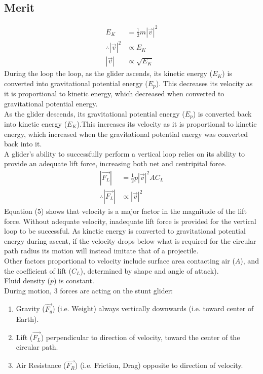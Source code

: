 \documentclass[11pt, a4paper]{article}
\def\ParagraphSpacing{30pt}
\begin{document}
	\subsection{Merit}
	\begin{align}
		E_K&=\frac{1}{2}m|\vec{v}|^2\\
		\therefore |\vec{v}|^2&\propto E_K\\
		|\vec{v}|&\propto \sqrt{E_K}
	\end{align}
	During the loop the loop, as the glider ascends, its kinetic energy ($E_K$) is converted into gravitational potential energy ($E_p$). This decreases its velocity as it is proportional to kinetic energy, which decreased when converted to gravitational potential energy. \\
	As the glider descends, its gravitational potential energy ($E_p$) is converted back into kinetic energy ($E_K$).This increases its velocity as it is proportional to kinetic energy, which increased when the gravitational potential energy was converted back into it.\\[\ParagraphSpacing]
	A glider's ability to successfully perform a vertical loop relies on its ability to provide an adequate lift force, increasing both net and centripital force.
	\begin{align}
		|\vec{F_L}|&=\frac{1}{2}p|\vec{v}|^2AC_L\\
		\therefore |\vec{F_L}|&\propto |\vec{v}|^2
	\end{align}
	Equation (5) shows that velocity is a major factor in the magnitude of the lift force. Without adequate velocity, inadequate lift force is provided for the vertical loop to be successful. As kinetic energy is converted to gravitational potential energy during ascent, if the velocity drops below what is required for the circular path radius its motion will instead imitate that of a projectile.\\
	Other factors proportional to velocity include surface area contacting air ($A$), and the coefficient of lift ($C_L$), determined by shape and angle of attack).\\
	Fluid density ($p$) is constant.\\[\ParagraphSpacing]
	During motion, 3 forces are acting on the stunt glider:
	\begin{enumerate}
		\item Gravity ($\vec{F_g}$) (i.e. Weight) always vertically downwards (i.e. toward center of Earth).
		\item Lift ($\vec{F_L}$) perpendicular to direction of velocity, toward the center of the circular path.
		\item Air Resistance ($\vec{F_R}$) (i.e. Friction, Drag) opposite to direction of velocity.
	\end{enumerate}
\end{document}

